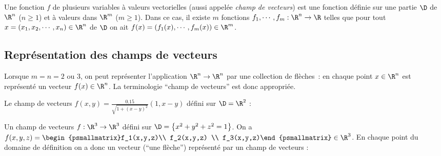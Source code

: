 \begin{definition}
	Une fonction $f$ de plusieurs variables à valeurs vectorielles (aussi appelée \emph{champ de vecteurs}) est une fonction définie sur une partie $\D$ de $\R^n$ ($n\geq 1$) et à valeurs dans $\R^m$ ($m\geq 1$). Dans ce cas, il existe $m$ fonctions $f_1,\cdots,f_m : \R^n \to \R$ telles que pour tout $x =(x_1,x_2,\cdots,x_n)\in \R^n$ de $\D$ on ait $f(x) = (f_1(x),\cdots,f_m(x)) \in \R^m$.
\end{definition}

\sld{\vfill\pagebreak[5]}%
\subsection{Représentation des champs de vecteurs}

Lorsque $m=n=2$ ou $3$, on peut représenter l'application $\R^n \to \R^n$ par une collection de flèches~: en chaque point $x\in\R^n$ est représenté un vecteur $f(x)\in \R^n$. La terminologie ``champ de vecteurs'' est donc appropriée.

\sld{\vfill\pagebreak[5]}%
\begin{exemple}
	Le champ de vecteurs $f(x,y) = \frac{0.15}{\sqrt{1+(x-y)^2}} \left(1, x-y\right )$ défini sur $\D = \R^2$ :
	\begin{center}
		
		\tikzexternaldisable
	\end{center}
\end{exemple}

\sld{\vfill\pagebreak[5]}%
\begin{exemple}
	Un champ de vecteurs $f:\R^3 \to \R^3$ défini sur $\D =\left\{ x^2 + y^2 + z^2 =1 \right\}$. On a $f(x,y,z) = \begin{psmallmatrix}f_1(x,y,z)\\ f_2(x,y,z) \\ f_3(x,y,z)\end{psmallmatrix} \in \R^3$. En chaque point du domaine de définition on a donc un vecteur (``une flèche'') représenté par un champ de vecteurs :
	\begin{center}
		\tikzexternalenable
		

	\end{center}
\end{exemple}


